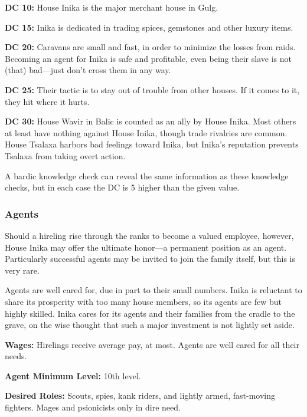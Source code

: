 \textbf{DC 10:} House Inika is the major merchant house in Gulg.

\textbf{DC 15:} Inika is dedicated in trading spices, gemstones and other luxury items.

\textbf{DC 20:} Caravans are small and fast, in order to minimize the losses from raids. Becoming an agent for Inika is safe and profitable, even being their slave is not (that) bad---just don't cross them in any way.

\textbf{DC 25:} Their tactic is to stay out of trouble from other houses.  If it comes to it, they hit where it hurts. 

\textbf{DC 30:} House Wavir in Balic is counted as an ally by House Inika. Most others at least have nothing against House Inika, though trade rivalries are common. House Tsalaxa harbors bad feelings toward Inika, but Inika's reputation prevents Tsalaxa from taking overt action.

A bardic knowledge check can reveal the same information as these knowledge checks, but in each case the DC is 5 higher than the given value.

\subsubsection{Agents}
Should a hireling rise through the ranks to become a valued employee, however, House Inika may offer the ultimate honor---a permanent position as an agent. Particularly successful agents may be invited to join the family itself, but this is very rare.

Agents are well cared for, due in part to their small numbers. Inika is reluctant to share its prosperity with too many house members, so its agents are few but highly skilled. Inika cares for its agents and their families from the cradle to the grave, on the wise thought that such a major investment is not lightly set aside.

\textbf{Wages:} Hirelings receive average pay, at most. Agents are well cared for all their needs.

\textbf{Agent Minimum Level:} 10th level.

\textbf{Desired Roles:} Scouts, spies, kank riders, and lightly armed, fast-moving fighters. Mages and psionicists only in dire need.